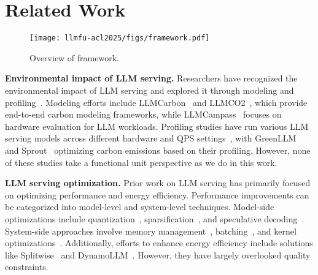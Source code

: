 \section{Related Work}\label{sec:related} 

\begin{figure*}[!t]
    \centering
    \texttt{[image: llmfu-acl2025/figs/framework.pdf]}
    \caption{Overview of \SYSTEM{} framework.}
    \label{fig:framework}
\end{figure*}

\noindent \textbf{Environmental impact of LLM serving.} Researchers have recognized the environmental impact of LLM serving and explored it through modeling and profiling~\cite{ding2024sustainable}. Modeling efforts include LLMCarbon~\cite{faiz2024llmcarbon} and LLMCO2~\cite{fu2024llmco2}, which provide end-to-end carbon modeling frameworks, while LLMCampass~\cite{zhang2024llmcompass} focuses on hardware evaluation for LLM workloads. Profiling studies have run various LLM serving models across different hardware and QPS settings~\cite{nguyen2024towards,li2024arenahard,patel2024characterizing}, with GreenLLM~\cite{shi2024greenllm} and Sprout~\cite{li2024sprout} optimizing carbon emissions based on their profiling. However, none of these studies take a functional unit perspective as we do in this work.

\noindent \textbf{LLM serving optimization.} Prior work on LLM serving has primarily focused on optimizing performance and energy efficiency. Performance improvements can be categorized into model-level and system-level techniques. Model-side optimizations include quantization~\cite{lin2024awq, frantar2022gptq}, sparsification~\cite{frantar2023sparsegpt}, and speculative decoding~\cite{leviathan2023fast}. System-side approaches involve memory management~\cite{kwon2023efficient}, batching~\cite{agrawal2024taming, yu2022orca}, and kernel optimizations~\cite{dao2022flashattention}. Additionally, efforts to enhance energy efficiency include solutions like Splitwise~\cite{patel2024splitwise} and DynamoLLM~\cite{stojkovic2024dynamollm}. However, they have largely overlooked quality constraints.


